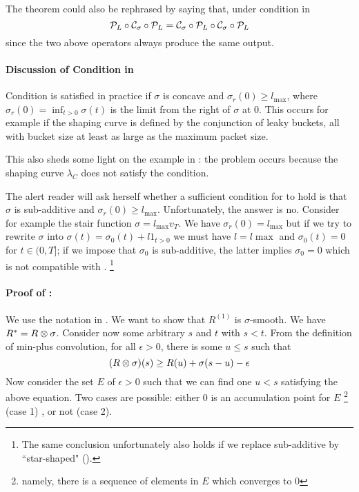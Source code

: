 The theorem could also be rephrased by saying that, under
condition in 
$$ \mathcal P_L \circ
\mathcal C_{\sigma} \circ \mathcal P_L = \mathcal C_{\sigma} \circ \mathcal P_L \circ
\mathcal C_{\sigma} \circ \mathcal P_L$$ since the two above operators
always produce the same output.

\paragraph{Discussion of Condition in }

Condition  is satisfied in practice if $\sigma$
is concave and $\sigma_r(0) \geq l_{\max}$, where $\sigma_r(0)=
\inf_{t>0} \sigma(t)$ is the limit from the right of $\sigma$ at
$0$. This occurs for example if the shaping curve is defined by
the conjunction of leaky buckets, all with bucket size at least as
large as the maximum packet size.

This also sheds some light on the example in : the
problem occurs because the shaping curve $\lambda_C$ does not
satisfy the condition.

The alert reader will ask herself whether a sufficient condition
for  to hold is that $\sigma$ is sub-additive
and $\sigma_r(0) \geq l_{\max}$. Unfortunately, the answer is no.
Consider for example the stair function $\sigma=l_{\max}v_{T}$. We
have $\sigma_r(0) = l_{\max}$ but if we try to rewrite $\sigma$
into $\sigma(t)=\sigma_0(t) + l 1_{t>0}$ we must have $l=l{\max}$
and $\sigma_0(t)=0$ for $t \in (0,T]$; if we impose that
$\sigma_0$ is sub-additive, the latter implies $\sigma_0=0$ which
is not compatible with .%
\footnote{The same conclusion unfortunately also holds if we
replace sub-additive by ``star-shaped" ().}

\paragraph{Proof of : }
 We use the notation in
. We want to show that $R^{(1)}$ is
$\sigma$-smooth. We have $R^* = R \otimes \sigma$. Consider now some
arbitrary $s$ and $t$ with $s<t$. From the definition of min-plus
convolution, for all $\epsilon
>0$, there is some $u \leq s$ such that
\begin{equation}\mylabel{eq-sladk8}
 (R \mpc \sigma)(s)  \geq R(u) + \sigma(s-u) - \epsilon
\end{equation}
Now consider the set $E$ of $\epsilon >0$ such that we can find
one $u < s$ satisfying the above equation. Two cases are possible:
either $0$ is an accumulation point for $E$%
\footnote{namely, there is a sequence of elements in $E$ which
converges to $0$} (case 1) , or not (case 2).

